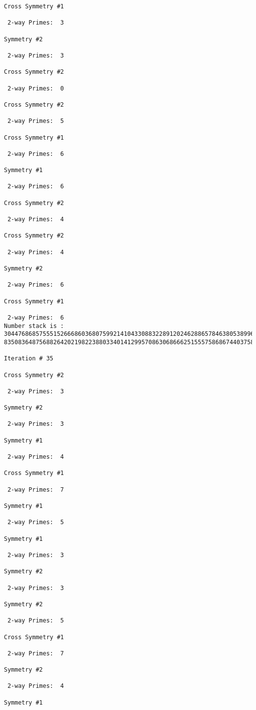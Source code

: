 \begin{verbatim}
Cross Symmetry #1

 2-way Primes: 	3

Symmetry #2

 2-way Primes: 	3

Cross Symmetry #2

 2-way Primes: 	0

Cross Symmetry #2

 2-way Primes: 	5

Cross Symmetry #1

 2-way Primes: 	6

Symmetry #1

 2-way Primes: 	6

Cross Symmetry #2

 2-way Primes: 	4

Cross Symmetry #2

 2-way Primes: 	4

Symmetry #2

 2-way Primes: 	6

Cross Symmetry #1

 2-way Primes: 	6
Number stack is :
30447686857555152666860368075992141043308832289120246288657846380538996794608835958544046240163340857
83508364875688264202198223880334014129957086306866625155575868674403758043361042640445859538806497699

Iteration #	35

Cross Symmetry #2

 2-way Primes: 	3

Symmetry #2

 2-way Primes: 	3

Symmetry #1

 2-way Primes: 	4

Cross Symmetry #1

 2-way Primes: 	7

Symmetry #1

 2-way Primes: 	5

Symmetry #1

 2-way Primes: 	3

Symmetry #2

 2-way Primes: 	3

Symmetry #2

 2-way Primes: 	5

Cross Symmetry #1

 2-way Primes: 	7

Symmetry #2

 2-way Primes: 	4

Symmetry #1


\end{verbatim}
